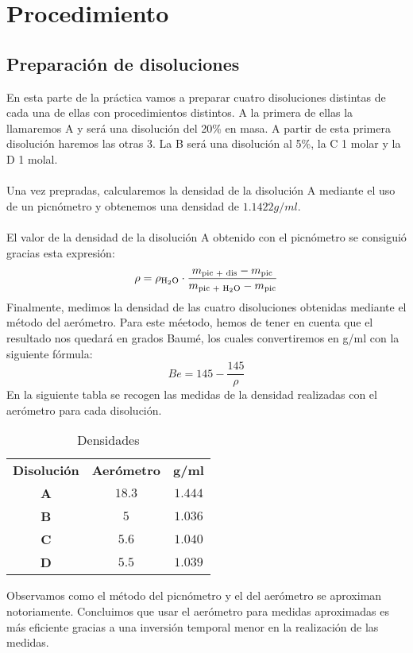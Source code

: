 \clearpage

\section{Procedimiento}
\subsection{Preparación de disoluciones}
\noindent En esta parte de la práctica vamos a preparar cuatro disoluciones distintas de  cada una de ellas con procedimientos distintos. A la primera de ellas la llamaremos A y será una disolución del 20\% en masa. A partir de esta primera disolución haremos las otras 3. La B será una disolución al 5\%, la C 1 molar y la D 1 molal.\\\\
Una vez prepradas, calcularemos la densidad de la disolución A mediante el uso de un picnómetro y obtenemos una densidad de $1.1422 \si{g/ml}$.\\\\
\noindent El valor de la densidad de la disolución A obtenido con el picnómetro se consiguió gracias esta expresión:
\[\rho = \rho_{\ce{H2O}}\cdot\frac{m_{\text{pic + dis}}-m_{\text{pic}}}{m_{\text{pic + \ce{H2O}}}-m_{\text{pic}}}\]
\noindent Finalmente, medimos la densidad de las cuatro disoluciones obtenidas mediante el método del aerómetro. Para este méetodo, hemos de tener en cuenta que el resultado nos quedará en grados Baumé, los cuales convertiremos en \si{g/ml} con la siguiente fórmula:
\[Be = 145-\frac{145}{\rho}\]
\noindent En la siguiente tabla se recogen las medidas de la densidad realizadas con el aerómetro para cada disolución.\\
\begin{table}[H]
\centering
\begin{tabular}{ccc}
\rowcolor[HTML]{9698ED} 
\textbf{Disolución} & \textbf{Aerómetro} & \textbf{g/ml} \\
\rowcolor[HTML]{DAE8FC} 
\textbf{A} & $18.3$ & $1.444$ \\
\textbf{B} & $5$ & $1.036$ \\
\rowcolor[HTML]{DAE8FC} 
\textbf{C} & $5.6$ & $1.040$ \\
\textbf{D} & $5.5$ & $1.039$
\end{tabular}
\caption{Densidades}
\label{densidades}
\end{table}
\vspace{0.2cm}
\noindent Observamos como el método del picnómetro y el del aerómetro se aproximan notoriamente. Concluimos que usar el aerómetro para medidas aproximadas es más eficiente gracias a una inversión temporal menor en la realización de las medidas.

